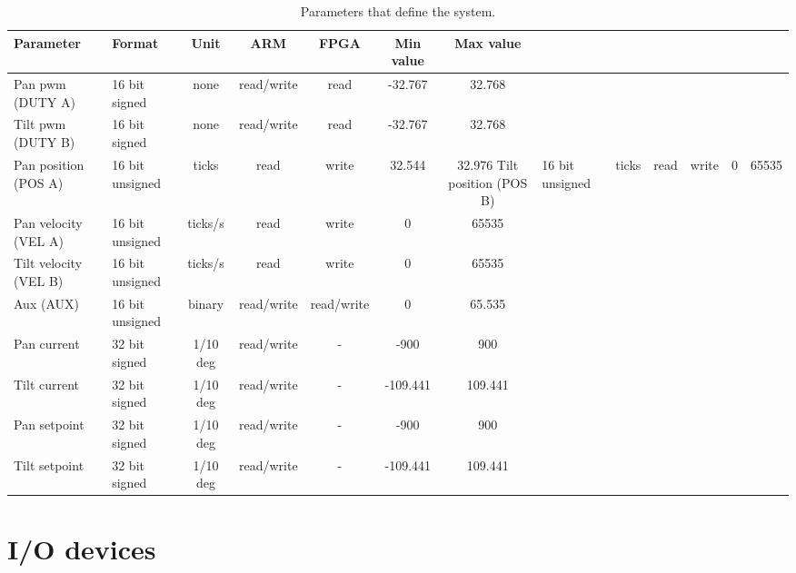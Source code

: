 \begin{table}[htb]				
	\centering
	\begin{tabular}{llccccc}			
	Parameter & Format & Unit & ARM & FPGA & Min value & Max value\\		
	\midrule										
Pan pwm (DUTY A) &16 bit signed & none & read/write & read & -32.767 &  32.768  \\
Tilt pwm (DUTY B) & 16 bit signed  & none&read/write & read & -32.767 &  32.768 \\
Pan position (POS A) & 16 bit unsigned&ticks & read & write & 32.544 & 32.976
Tilt position (POS B) & 16 bit unsigned&ticks & read & write & 0 & 65535 \\
Pan velocity (VEL A) & 16 bit unsigned&ticks/s & read & write & 0 & 65535 \\
Tilt velocity (VEL B) & 16 bit unsigned & ticks/s&read & write & 0 & 65535 \\
Aux (AUX) & 16 bit unsigned &binary& read/write & read/write & 0 & 65.535 \\
Pan current & 32 bit signed & 1/10 deg & read/write & - & -900 & 900 \\
Tilt current  & 32 bit signed & 1/10 deg & read/write & - & -109.441 & 109.441 \\
Pan setpoint  & 32 bit signed & 1/10 deg & read/write & - & -900 & 900 \\
Tilt setpoint  & 32 bit signed & 1/10 deg & read/write & - & -109.441 & 109.441 \\
	\end{tabular}
	\caption{Parameters that define the system.}				
	\label{tab:parameters}			
\end{table}


\section{I/O devices}\label{sec:iodevices}


